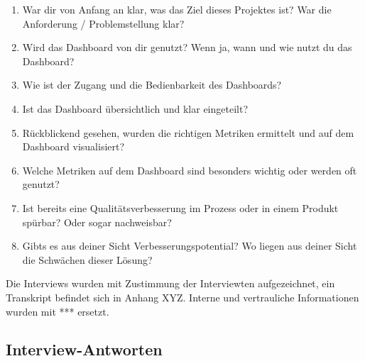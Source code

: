 \begin{enumerate}
    \item War dir von Anfang an klar, was das Ziel dieses Projektes ist? War die Anforderung / Problemstellung klar?
    \item Wird das Dashboard von dir genutzt? Wenn ja, wann und wie nutzt du das Dashboard?
    \item Wie ist der Zugang und die Bedienbarkeit des Dashboards?
    \item Ist das Dashboard übersichtlich und klar eingeteilt?
    \item Rückblickend gesehen, wurden die richtigen Metriken ermittelt und auf dem Dashboard visualisiert?
    \item Welche Metriken auf dem Dashboard sind besonders wichtig oder werden oft genutzt?
    \item Ist bereits eine Qualitätsverbesserung im Prozess oder in einem Produkt spürbar? Oder sogar nachweisbar?
    \item Gibts es aus deiner Sicht Verbesserungspotential? Wo liegen aus deiner Sicht die Schwächen dieser Lösung?
\end{enumerate}

Die Interviews wurden mit Zustimmung der Interviewten aufgezeichnet, ein Transkript befindet sich in Anhang XYZ.
Interne und vertrauliche Informationen wurden mit *** ersetzt.

\subsection{Interview-Antworten}

